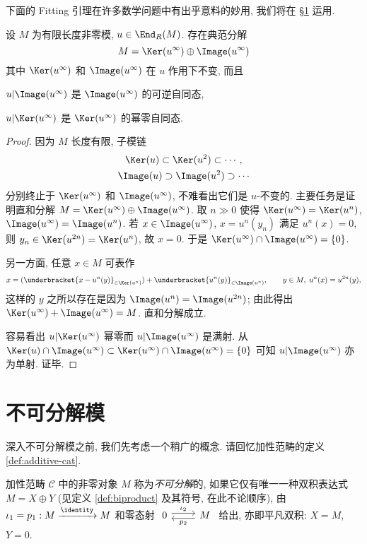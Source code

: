 下面的 Fitting 引理在许多数学问题中有出乎意料的妙用, 我们将在 \S\ref{sec:indecomposable-mod} 运用.
\begin{lemma}[H.\ Fitting]\label{prop:Fitting}
	设 $M$ 为有限长度非零模, $u \in \End_R(M)$. 存在典范分解
	\[ M = \Ker(u^\infty) \oplus \Image(u^\infty) \]
	其中 $\Ker(u^\infty)$ 和 $\Image(u^\infty)$ 在 $u$ 作用下不变, 而且
	\begin{compactitem}
		\item $u|\Image(u^\infty)$ 是 $\Image(u^\infty)$ 的可逆自同态,
		\item $u|\Ker(u^\infty)$ 是 $\Ker(u^\infty)$ 的幂零自同态.
	\end{compactitem}
\end{lemma}
\begin{proof}
	因为 $M$ 长度有限, 子模链
	\begin{gather*}
		\Ker(u) \subset \Ker(u^2) \subset \cdots, \\
		\Image(u) \supset \Image(u^2) \supset \cdots
	\end{gather*}
	分别终止于 $\Ker(u^\infty)$ 和 $\Image(u^\infty)$, 不难看出它们是 $u$-不变的. 主要任务是证明直和分解 $M = \Ker(u^\infty) \oplus \Image(u^\infty)$. 取 $n \gg 0$ 使得 $\Ker(u^\infty) = \Ker(u^n)$, $\Image(u^\infty) = \Image(u^n)$. 若 $x \in \Image(u^\infty)$, $x = u^n(y_n)$ 满足 $u^n(x)=0$, 则 $y_n \in \Ker(u^{2n})=\Ker(u^n)$, 故 $x=0$. 于是 $\Ker(u^\infty) \cap \Image(u^\infty) = \{0\}$. 
	
	另一方面, 任意 $x \in M$ 可表作
	\[ x = (\underbracket{x - u^n(y)}_{\in \Ker(u^n)}) + \underbracket{u^n(y)}_{\in \Image(u^n)}, \qquad y \in M, \; u^n(x) = u^{2n}(y), \]
	这样的 $y$ 之所以存在是因为 $\Image(u^n) = \Image(u^{2n})$; 由此得出 $\Ker(u^\infty) + \Image(u^\infty) = M$. 直和分解成立.

	容易看出 $u|\Ker(u^\infty)$ 幂零而 $u|\Image(u^\infty)$ 是满射. 从 $\Ker(u) \cap \Image(u^\infty) \subset \Ker(u^\infty) \cap \Image(u^\infty) = \{0\}$ 可知 $u|\Image(u^\infty)$ 亦为单射. 证毕.
\end{proof}

\section{不可分解模}\label{sec:indecomposable-mod}
深入不可分解模之前, 我们先考虑一个稍广的概念. 请回忆加性范畴的定义 \ref{def:additive-cat}.

\begin{definition}
	加性范畴 $\mathcal{C}$ 中的非零对象 $M$ 称为\emph{不可分解}的, 如果它仅有唯一一种双积表达式 $M = X \oplus Y$ (见定义 \ref{def:biproduct} 及其符号, 在此不论顺序), 由 $\iota_1 = p_1: M \xrightarrow{\identity} M$ 和零态射 $\begin{tikzcd} 0 \arrow[yshift=0.6ex, r, "\iota_2"] & M \arrow[yshift=-0.6ex, l, "p_2"] \end{tikzcd}$ 给出, 亦即平凡双积: $X=M$, $Y=0$.
\end{definition}

